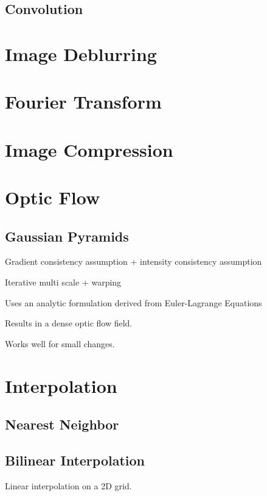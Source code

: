 \subsection{Convolution}



\section{Image Deblurring}



\section{Fourier Transform}

\section{Image Compression}

\section{Optic Flow}


\subsection{Gaussian Pyramids}

Gradient consistency assumption + intensity consistency assumption

Iterative multi scale + warping

Uses an analytic formulation derived from Euler-Lagrange Equations

Results in a dense optic flow field.

Works well for small changes.

\section{Interpolation}

\subsection{Nearest Neighbor}

\subsection{Bilinear Interpolation}

Linear interpolation on a 2D grid. 


